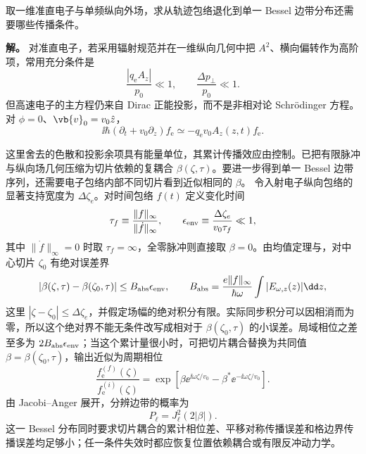 \begin{exbox}
取一维准直电子与单频纵向外场，求从轨迹包络退化到单一 Bessel 边带分布还需要哪些传播条件。

\textbf{解。}
对准直电子，若采用辐射规范并在一维纵向几何中把 $A^2$、横向偏转作为高阶项，常用充分条件是
\begin{equation}
{
\frac{|q_{\mathrm e} A_z|}{p_0}\ll1,
\qquad
\frac{\Delta p_\perp}{p_0}\ll1.}
\label{eq:pinem_ap_small_parameters}
\end{equation}
但高速电子的主方程仍来自 Dirac 正能投影，而不是非相对论 Schr\"odinger 方程。对 $\phi=0$、$\vb{v}_0=v_0\hat z$，
\begin{equation}
{
\ii\hbar(\partial_t+v_0\partial_z)f_{\mathrm e}
\simeq-q_{\mathrm e} v_0A_z(z,t)f_{\mathrm e}.}
\label{eq:dirac_projected_pinem_envelope}
\end{equation}

这里舍去的色散和投影余项具有能量单位，其累计传播效应由控制。已把有限脉冲与纵向场几何压缩为切片依赖的复耦合 $\beta(\zeta,\tau)$。要进一步得到单一 Bessel 边带序列，还需要电子包络内部不同切片看到近似相同的 $\beta$。
令入射电子纵向包络的显著支持宽度为 $\Delta\zeta_e$。对时间包络 $f(t)$ 定义变化时间
\begin{equation*}
 \tau_f\equiv\frac{\|f\|_\infty}{\|\dot f\|_\infty},
 \qquad
 \epsilon_{\rm env}\equiv\frac{\Delta\zeta_e}{v_0\tau_f}\ll1,
\end{equation*}
其中 $\|\dot f\|_\infty=0$ 时取 $\tau_f=\infty$，全零脉冲则直接取 $\beta=0$。由均值定理与，对中心切片 $\zeta_0$ 有绝对误差界
\[
 |\beta(\zeta,\tau)-\beta(\zeta_0,\tau)|
 \le B_{\rm abs}\epsilon_{\rm env},\qquad
 B_{\rm abs}=\frac{e\|f\|_\infty}{\hbar\omega}
                 \int|E_{\omega,z}(z)|\dd z,
\]
这里 $|\zeta-\zeta_0|\le\Delta\zeta_e$，并假定场幅的绝对积分有限。实际同步积分可以因相消而为零，所以这个绝对界不能无条件改写成相对于 $\beta(\zeta_0,\tau)$ 的小误差。局域相位之差至多为 $2B_{\rm abs}\epsilon_{\rm env}$；当这个累计量很小时，可把切片耦合替换为共同值 $\beta=\beta(\zeta_0,\tau)$，输出近似为周期相位
\begin{equation*}
\frac{f_{\mathrm e}^{(f)}(\zeta)}{f_{\mathrm e}^{(i)}(\zeta)}
=\exp[\beta \ee^{\ii\omega\zeta/v_0}-\beta^*\ee^{-\ii\omega\zeta/v_0}].
\end{equation*}
由 Jacobi--Anger 展开，分辨边带的概率为
\begin{equation*}
P_\ell=J_\ell^2(2|\beta|).
\end{equation*}
这一 Bessel 分布同时要求切片耦合的累计相位差、平移对称传播误差和格边界传播误差均足够小；任一条件失效时都应恢复位置依赖耦合或有限反冲动力学。
\end{exbox}


